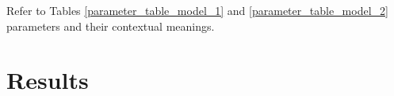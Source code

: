 \documentclass{amsart}
\theoremstyle{definition}
\theoremstyle{remark}
\numberwithin{equation}{section}
\begin{document}
Refer to Tables \ref{parameter_table_model_1} and \ref{parameter_table_model_2} parameters and their contextual meanings.

































\pagebreak
\section{Results}
\end{document}
